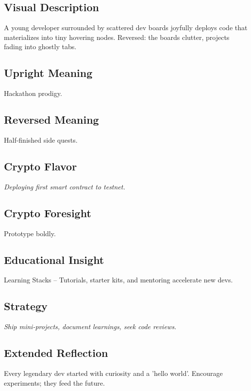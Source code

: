\documentclass[11pt,oneside]{book}
\begin{document}
\begin{minipage}[t]{0.55\textwidth}
  \vspace{0pt}

  \subsection*{Visual Description}
  A young developer surrounded by scattered dev boards joyfully deploys code that materializes into tiny hovering nodes. Reversed: the boards clutter, projects fading into ghostly tabs.

  \subsection*{Upright Meaning}
  Hackathon prodigy.

  \subsection*{Reversed Meaning}
  Half-finished side quests.

  \subsection*{Crypto Flavor}
  \textit{Deploying first smart contract to testnet.}

  \subsection*{Crypto Foresight}
  Prototype boldly.

  \subsection*{Educational Insight}
  Learning Stacks – Tutorials, starter kits, and mentoring accelerate new devs.

  \subsection*{Strategy}
  \textit{Ship mini-projects, document learnings, seek code reviews.}

  \subsection*{Extended Reflection}
  Every legendary dev started with curiosity and a 'hello world'. Encourage experiments; they feed the future.


\end{minipage}
\end{document}
